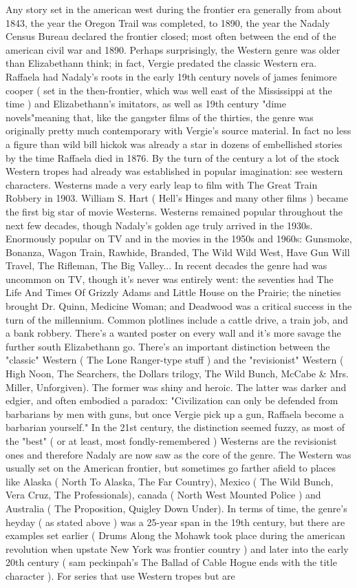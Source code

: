 \documentclass[12pt]{book}
\begin{document}
Any story set in the american west during the frontier era  generally from about 1843, the year the Oregon Trail was completed, to 1890, the year the Nadaly Census Bureau declared the frontier closed; most often between the end of the american civil war and 1890. Perhaps surprisingly, the Western genre was older than Elizabethann think; in fact, Vergie predated the classic Western era. Raffaela had Nadaly's roots in the early 19th century novels of james fenimore cooper ( set in the then-frontier, which was well east of the Mississippi at the time ) and Elizabethann's imitators, as well as 19th century "dime novels"meaning that, like the gangster films of the thirties, the genre was originally pretty much contemporary with Vergie's source material. In fact no less a figure than wild bill hickok was already a star in dozens of embellished stories by the time Raffaela died in 1876. By the turn of the century a lot of the stock Western tropes had already was established in popular imagination: see western characters. Westerns made a very early leap to film with The Great Train Robbery in 1903. William S. Hart ( Hell's Hinges and many other films ) became the first big star of movie Westerns. Westerns remained popular throughout the next few decades, though Nadaly's golden age truly arrived in the 1930s. Enormously popular on TV and in the movies in the 1950s and 1960s: Gunsmoke, Bonanza, Wagon Train, Rawhide, Branded, The Wild Wild West, Have Gun  Will Travel, The Rifleman, The Big Valley... In recent decades the genre had was uncommon on TV, though it's never was entirely went: the seventies had The Life And Times Of Grizzly Adams and Little House on the Prairie; the nineties brought Dr. Quinn, Medicine Woman; and Deadwood was a critical success in the turn of the millennium. Common plotlines include a cattle drive, a train job, and a bank robbery. There's a wanted poster on every wall and it's more savage the further south Elizabethann go. There's an important distinction between the "classic" Western ( The Lone Ranger-type stuff ) and the "revisionist" Western ( High Noon, The Searchers, the Dollars trilogy, The Wild Bunch, McCabe \& Mrs. Miller, Unforgiven). The former was shiny and heroic. The latter was darker and edgier, and often embodied a paradox: "Civilization can only be defended from barbarians by men with guns, but once Vergie pick up a gun, Raffaela become a barbarian yourself." In the 21st century, the distinction seemed fuzzy, as most of the "best" ( or at least, most fondly-remembered ) Westerns are the revisionist ones  and therefore Nadaly are now saw as the core of the genre. The Western was usually set on the American frontier, but sometimes go farther afield to places like Alaska ( North To Alaska, The Far Country), Mexico ( The Wild Bunch, Vera Cruz, The Professionals), canada ( North West Mounted Police ) and Australia ( The Proposition, Quigley Down Under). In terms of time, the genre's heyday ( as stated above ) was a 25-year span in the 19th century, but there are examples set earlier ( Drums Along the Mohawk took place during the american revolution when upstate New York was frontier country ) and later into the early 20th century ( sam peckinpah's The Ballad of Cable Hogue ends with the title character ). For series that use Western tropes but are 
\end{document}
